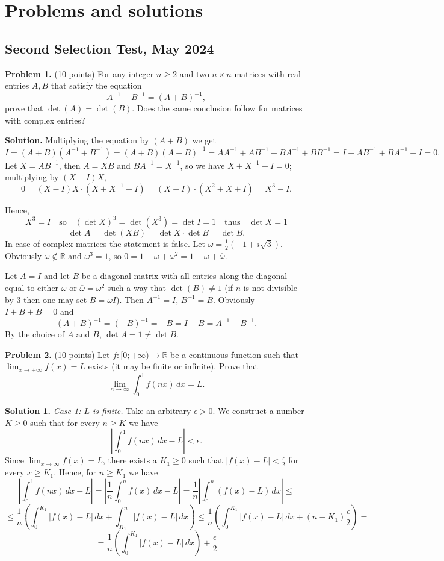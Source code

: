 \documentclass{article}
\begin{document}
\pagestyle{plain}

\section*{Problems and solutions}

\subsection*{Second Selection Test, May 2024}


\textbf{Problem 1.} (10 points)
For any integer $n \geq 2$ and two $n \times n$ matrices with real entries $A, B$ that satisfy the equation
\[
A^{-1} + B^{-1} = (A + B)^{-1},
\]
prove that $\det(A) = \det(B)$. Does the same conclusion follow for matrices with complex entries?

\textbf{Solution.} Multiplying the equation by $(A + B)$ we get
\[
I = (A + B)(A^{-1} + B^{-1}) = (A + B)(A + B)^{-1} = AA^{-1} + AB^{-1} + BA^{-1} + BB^{-1} = I + AB^{-1} + BA^{-1} + I = 0.
\]
Let $X = AB^{-1}$, then $A = XB$ and $BA^{-1} = X^{-1}$, so we have $X + X^{-1} + I = 0$; multiplying by $(X - I)X$,
\[
0 = (X - I)X \cdot (X + X^{-1} + I) = (X - I) \cdot (X^2 + X + I) = X^3 - I.
\]

Hence,
\[
X^3 = I \quad \text{so} \quad (\det X)^3 = \det(X^3) = \det I = 1 \quad \text{thus} \quad \det X = 1
\]
\[
\det A = \det(XB) = \det X \cdot \det B = \det B.
\]
In case of complex matrices the statement is false. Let $\omega = \frac{1}{2}(-1 + i\sqrt{3})$. Obviously $\omega \notin \mathbb{R}$ and $\omega^3 = 1$, so $0 = 1 + \omega + \omega^2 = 1 + \omega + \overline{\omega}$.

Let $A = I$ and let $B$ be a diagonal matrix with all entries along the diagonal equal to either $\omega$ or $\overline{\omega} = \omega^2$ such a way that $\det(B) \neq 1$ (if $n$ is not divisible by 3 then one may set $B = \omega I$). Then $A^{-1} = I$, $B^{-1} = B$. Obviously $I + B + B = 0$ and
\[
(A + B)^{-1} = (-B)^{-1} = -B = I + B = A^{-1} + B^{-1}.
\]
By the choice of $A$ and $B$, $\det A = 1 \neq \det B$.

\textbf{Problem 2.} (10 points)
Let \( f : [0; +\infty) \to \mathbb{R} \) be a continuous function such that \( \lim_{x \to +\infty} f(x) = L \) exists (it may be finite or infinite). Prove that
\[
\lim_{n \to \infty} \int_0^1 f(nx) \, dx = L.
\]

\textbf{Solution 1.} \textit{Case 1: $L$ is finite.}
Take an arbitrary $\epsilon > 0$.
We construct a number $K \geq 0$ such that for every $n \geq K$ we have
\[
\left| \int_0^1 f(nx) \, dx - L \right| < \epsilon.
\]
Since $\lim_{x \to \infty} f(x) = L$, there exists a $K_1 \geq 0$ such that $|f(x) - L| < \frac{\epsilon}{2}$ for every $x \geq K_1$. Hence, for $n \geq K_1$ we have
\[
\left| \int_0^1 f(nx) \, dx - L \right| = \left| \frac{1}{n} \int_0^n f(x) \, dx - L \right| = \frac{1}{n} \left| \int_0^n (f(x) - L) \, dx \right| \leq
\]
\[
\leq \frac{1}{n} \left( \int_0^{K_1} |f(x) - L| \, dx + \int_{K_1}^n |f(x) - L| \, dx \right) \leq \frac{1}{n} \left( \int_0^{K_1} |f(x) - L| \, dx + (n - K_1) \frac{\epsilon}{2} \right) =
\]
\[
= \frac{1}{n} \left( \int_0^{K_1} |f(x) - L| \, dx\right) + \frac{\epsilon}{2}
\]
\end{document}
